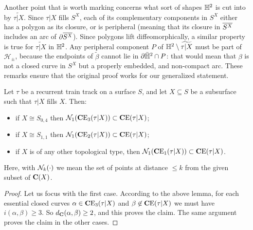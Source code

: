 Another point that is worth marking concerns what sort of shapes $\mathbb H^2$ is cut into by $\widetilde{\tau|X}$. Since $\tau|X$ fills $S^X$, each of its complementary components in $S^X$ either has a polygon as its closure, or is peripheral (meaning that its closure in $\overline{S^X}$ includes an arc of $\partial\overline{S^X}$). Since polygons lift diffeomorphically, a similar property is true for $\widetilde{\tau|X}$ in $\mathbb H^2$. Any peripheral component $P$ of $\mathbb H^2\setminus \widetilde{\tau|X}$ must be part of $\mathcal H_\pm$, because the endpoints of $\tilde\beta$ cannot lie in $\partial\bar{\mathbb H}^2\cap P$: that would mean that $\beta$ is not a closed curve in $S^X$ but a properly embedded, and non-compact arc. These remarks ensure that the original proof works for our generalized statement.

\begin{lemma}\label{lem:ccnesting}
Let $\tau$ be a recurrent train track on a surface $S$, and let $X\subseteq S$ be a subsurface such that $\tau|X$ fills $X$. Then:
\begin{itemize}
\item if $X\cong S_{0,4}$ then ${\mathcal N}_1(\mathbf C \mathrm E_3(\tau|X))\subset \mathbf C \mathrm E(\tau|X)$;
\item if $X\cong S_{1,1}$ then ${\mathcal N}_1(\mathbf C \mathrm E_2(\tau|X))\subset \mathbf C \mathrm E(\tau|X)$;
\item if $X$ is of any other topological type, then ${\mathcal N}_1(\mathbf C \mathrm E_1(\tau|X))\subset \mathbf C \mathrm E(\tau|X)$.
\end{itemize}
\end{lemma}
Here, with ${\mathcal N}_k(\cdot)$ we mean the set of points at distance $\leq k$ from the given subset of $\mathbf C(X)$.

\begin{proof}
Let us focus with the first case. According to the above lemma, for each essential closed curves $\alpha\in \mathbf C \mathrm E_3(\tau|X)$ and $\beta\not\in \mathbf C \mathrm E(\tau|X)$ we must have $i(\alpha,\beta)\geq 3$. So $d_\mathbf C(\alpha,\beta)\geq 2$, and this proves the claim. The same argument proves the claim in the other cases.
\end{proof}

